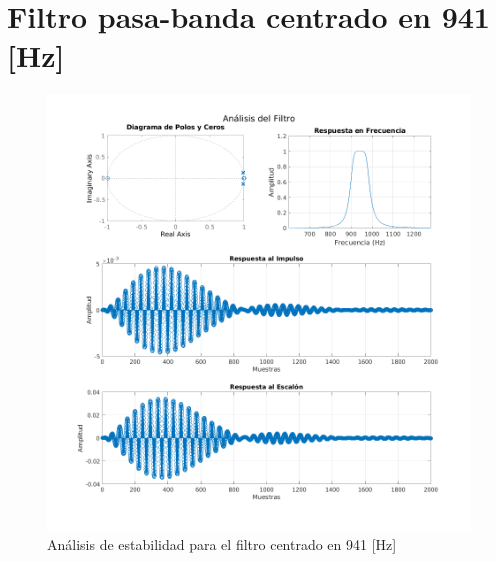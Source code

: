 \section{Filtro pasa-banda centrado en 941 [Hz]}
\begin{figure}[H]
  \centering
  \includegraphics[width=\linewidth]{images/simulacion/941.png}
  \caption{Análisis de estabilidad para el filtro centrado en 941 [Hz]}
  \label{fig:analisis_941}
\end{figure}

